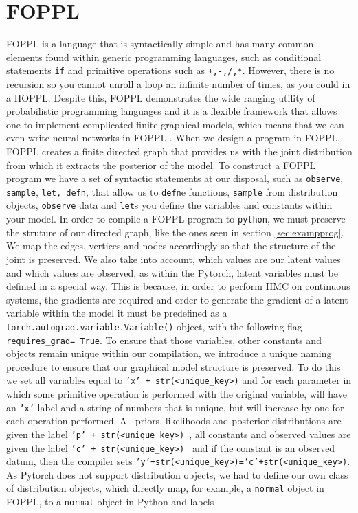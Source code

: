 \documentclass[twoside]{article}
\begin{document}
\section{FOPPL}
\label{sec:foppl}
FOPPL is a language that is syntactically simple and has many common elements found within generic programming languages, such as conditional statements \texttt{if} and primitive operations such as \texttt{+,-,/,*}. However, there is no recursion so you cannot unroll a loop an infinite number of times, as you could in a HOPPL. Despite this, FOPPL demonstrates the wide ranging utility of probabilistic programming languages and it is a flexible framework that allows one to implement complicated finite graphical models, which means that we can even write neural networks in FOPPL \citep{woodgroup2017}. When we design a program in FOPPL, FOPPL creates a finite directed graph that provides us with the joint distribution from which it extracts the posterior of the model. To construct a FOPPL program we have a set of syntactic statements at our disposal, such as \texttt{observe}, \texttt{sample}, \texttt{let, defn}, that allow us to \texttt{defn}e functions, \texttt{sample} from distribution objects, \texttt{observe} data and \texttt{let}s you define the variables and constants within your model. In order to compile a FOPPL program to \texttt{python}, we must preserve the struture of our directed graph, like the ones seen in section \ref{sec:exampprog}.  We map the edges, vertices and nodes accordingly so that the structure of the joint is preserved. We also take into account, which values are our latent values and which values are observed, as within the Pytorch, latent variables must be defined in a special way. This is because, in order to perform HMC on continuous systems, the gradients are required and order to generate the gradient of a latent variable within the model it must be predefined as a \texttt{torch.autograd.variable.Variable()} object, with the following flag \texttt{requires_grad= True}. To ensure that those variables, other constants and objects remain unique within our compilation, we introduce a unique naming procedure to ensure that our graphical model structure is preserved.  To do this we set all variables equal to \texttt{'x' + str(<unique_key>)} and for each parameter in which some primitive operation is performed with the original variable, will have an \texttt{'x'} label and a string of numbers that is unique, but will increase by one for each operation performed. All priors, likelihoods and posterior distributions are given the label \texttt{'p' + str(<unique_key>) }, all constants and observed values are given the label \texttt{'c' + str(<unique_key>) } and if the constant is an observed datum, then the compiler sets  \texttt{'y'+str(<unique_key>)='c'+str(<unique_key>)}. As Pytorch does not support distribution objects, we had to define our own class of distribution objects, which directly map, for example, a \texttt{normal} object in FOPPL, to a \texttt{normal} object in Python and labels 
\end{document}
